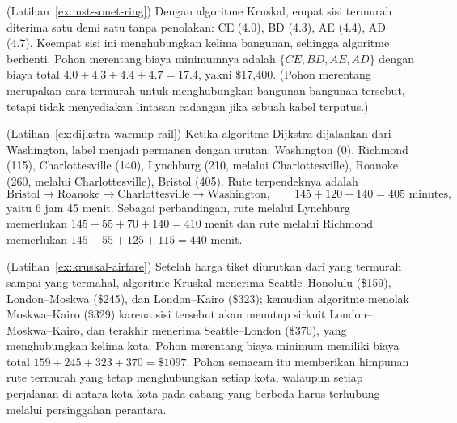 \begin{solution}(Latihan~\ref{ex:mst-sonet-ring})
Dengan algoritme Kruskal, empat sisi termurah diterima satu demi satu tanpa penolakan: CE (4.0), BD (4.3), AE (4.4), AD (4.7).  Keempat sisi ini menghubungkan kelima bangunan, sehingga algoritme berhenti.  Pohon merentang biaya minimumnya adalah $\{CE, BD, AE, AD\}$ dengan biaya total $4.0 + 4.3 + 4.4 + 4.7 = 17.4$, yakni \$17{,}400.  (Pohon merentang merupakan cara termurah untuk menghubungkan bangunan-bangunan tersebut, tetapi tidak menyediakan lintasan cadangan jika sebuah kabel terputus.)
\end{solution}

\begin{solution}(Latihan~\ref{ex:dijkstra-warmup-rail})
Ketika algoritme Dijkstra dijalankan dari Washington, label menjadi permanen dengan urutan: Washington (0), Richmond (115), Charlottesville (140), Lynchburg (210, melalui Charlottesville), Roanoke (260, melalui Charlottesville), Bristol (405).  Rute terpendeknya adalah
\[
\text{Bristol} \to \text{Roanoke} \to \text{Charlottesville} \to \text{Washington},
\qquad 145 + 120 + 140 = 405 \text{ minutes},
\]
yaitu 6 jam 45 menit.  Sebagai perbandingan, rute melalui Lynchburg memerlukan $145 + 55 + 70 + 140 = 410$ menit dan rute melalui Richmond memerlukan $145 + 55 + 125 + 115 = 440$ menit.
\end{solution}

\begin{solution}(Latihan~\ref{ex:kruskal-airfare})
Setelah harga tiket diurutkan dari yang termurah sampai yang termahal, algoritme Kruskal menerima Seattle--Honolulu (\$159), London--Moskwa (\$245), dan London--Kairo (\$323); kemudian algoritme menolak Moskwa--Kairo (\$329) karena sisi tersebut akan menutup sirkuit London--Moskwa--Kairo, dan terakhir menerima Seattle--London (\$370), yang menghubungkan kelima kota.  Pohon merentang biaya minimum memiliki biaya total $159 + 245 + 323 + 370 = \$1097$.  Pohon semacam itu memberikan himpunan rute termurah yang tetap menghubungkan setiap kota, walaupun setiap perjalanan di antara kota-kota pada cabang yang berbeda harus terhubung melalui persinggahan perantara.
\end{solution}

